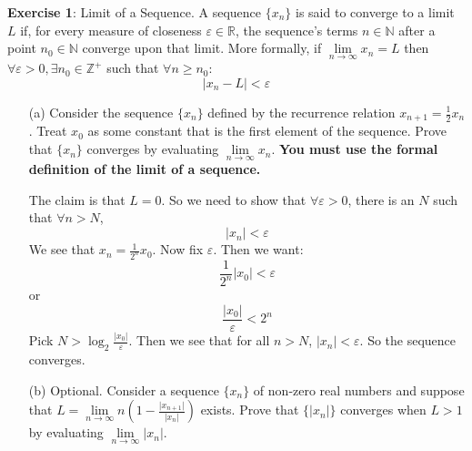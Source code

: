 \documentclass{article}
\begin{document}
    \textbf{Exercise 1}: Limit of a Sequence. A sequence $\{x_{n}\}$ is said to converge to a limit $L$ if, for every measure of closeness $\varepsilon \in \mathbb{R}$, the sequence's terms $n \in \mathbb{N}$ after a point $n_{0} \in \mathbb{N}$ converge upon that limit. More formally, if $\lim\limits_{n \to \infty}x_{n} = L$ then $\forall \varepsilon > 0, \exists n_{0} \in \mathbb{Z}^{+}$ such that $\forall n \geq n_{0}$:
        \begin{equation*}
            \lvert x_{n} - L \rvert < \varepsilon
        \end{equation*}
        \begin{itemize}
            \item [(a)] Consider the sequence $\{x_{n}\}$ defined by the recurrence relation $x_{n + 1} = \frac{1}{2}x_{n}$. Treat $x_{0}$ as some constant that is the first element of the sequence. Prove that $\{x_{n}\}$ converges by evaluating $\lim\limits_{n \to \infty}x_{n}$. \textbf{You must use the formal definition of the limit of a sequence.}
                \begin{answer}
                    The claim is that $L = 0$. So we need to show that $\forall \varepsilon > 0$, there is an $N$ such that $\forall n > N$, 
                        \begin{equation*}
                            \lvert x_{n} \rvert < \varepsilon
                        \end{equation*}
                    We see that $x_{n} = \frac{1}{2^{n}}x_{0}$. Now fix $\varepsilon$. Then we want:
                        \begin{equation*}
                            \dfrac{1}{2^{n}}\lvert x_{0} \rvert < \varepsilon
                        \end{equation*}
                    or
                        \begin{equation*}
                            \dfrac{\lvert x_{0} \rvert}{\varepsilon} < 2^{n}
                        \end{equation*}
                    Pick $N > \log_{2}\frac{\lvert x_{0} \rvert}{\varepsilon}$. Then we see that for all $n > N$, $\lvert x_{n} \rvert < \varepsilon$. So the sequence converges.
                \end{answer}

            \item [(b)] Optional. Consider a sequence $\{x_{n}\}$ of non-zero real numbers and suppose that $L = \lim\limits_{n \to \infty}n(1 - \frac{\lvert x_{n + 1} \rvert}{\lvert x_{n} \rvert})$ exists. Prove that $\{\lvert x_{n} \rvert\}$ converges when $L > 1$ by evaluating $\lim\limits_{n \to \infty}\lvert x_{n} \rvert$. 
        \end{itemize}
\end{document}

